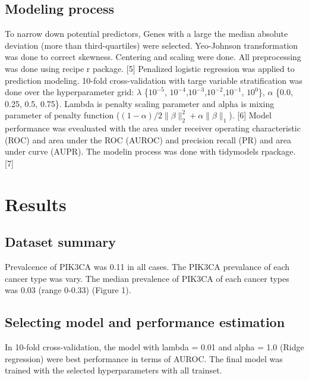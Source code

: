 \documentclass[10pt,letterpaper]{article}
\begin{document}
\hypertarget{modeling-process}{%
\subsection{Modeling process}\label{modeling-process}}

To narrow down potential predictors, Genes with a large the median
absolute deviation (more than third-quartiles) were selected.
Yeo-Johnson transformation was done to correct skewness. Centering and
scaling were done. All preprocessing was done using recipe r package.
{[}5{]} Penalized logistic regression was applied to prediction
modeling. 10-fold cross-validation with targe variable stratification
was done over the hyperparameter grid: \(\lambda\) \{\(10^{-5}\),
\(10^{-4}\),\(10^{-3}\),\(10^{-2}\),\(10^{-1}\), \(10^{0}\)\},
\(\alpha\) \{0.0, 0.25, 0.5, 0.75\}. Lambda is penalty scaling parameter
and alpha is mixing parameter of penalty function
(\((1-\alpha)/2 \lVert\beta\rVert_2^2+\alpha\lVert \beta \rVert_1\)).
{[}6{]} Model performance was evealuated with the area under receiver
operating characteristic (ROC) and area under the ROC (AUROC) and
precision recall (PR) and area under curve (AUPR). The modelin process
was done with tidymodels rpackage. {[}7{]}

\hypertarget{results}{%
\section{Results}\label{results}}

\hypertarget{dataset-summary}{%
\subsection{Dataset summary}\label{dataset-summary}}

Prevalcence of PIK3CA was 0.11 in all cases. The PIK3CA prevalance of
each cancer type was vary. The median prevalence of PIK3CA of each
cancer types was 0.03 (range 0-0.33) (Figure 1).

\hypertarget{selecting-model-and-performance-estimation}{%
\subsection{Selecting model and performance
estimation}\label{selecting-model-and-performance-estimation}}

In 10-fold cross-validation, the model with lambda = 0.01 and alpha =
1.0 (Ridge regression) were best performance in terms of AUROC. The
final model was trained with the selected hyperparameters with all
trainset.
\end{document}
